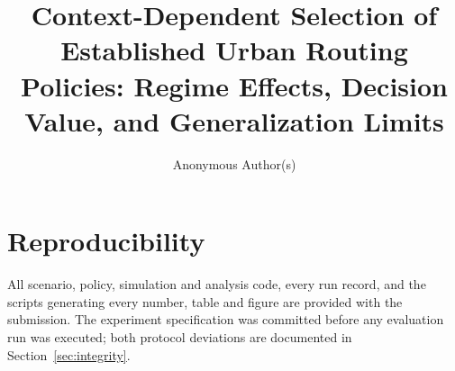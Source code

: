 



\title{Context-Dependent Selection of Established Urban Routing Policies:
Regime Effects, Decision Value, and Generalization Limits}
\author{Anonymous Author(s)}
\maketitle
















\section*{Reproducibility}
All scenario, policy, simulation and analysis code, every run record, and the
scripts generating every number, table and figure are provided with the
submission. The experiment specification was committed before any evaluation run
was executed; both protocol deviations are documented in
Section~\ref{sec:integrity}.






